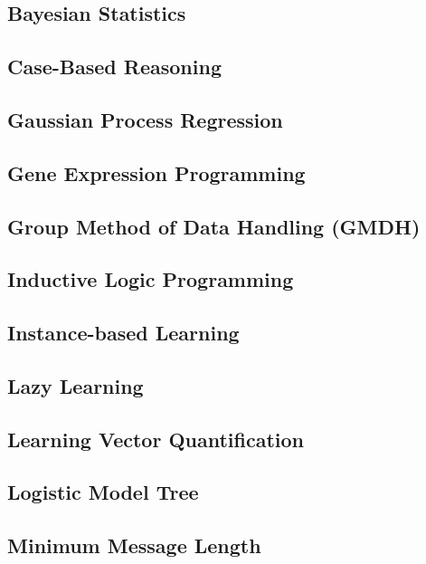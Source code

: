 \documentclass{report}
\begin{document}
	\subsection{Bayesian Statistics}
	\label{subsec:bayesian_statistics}

	\subsection{Case-Based Reasoning}

	\subsection{Gaussian Process Regression}

	\subsection{Gene Expression Programming}

	\subsection{Group Method of Data Handling (GMDH)}

	\subsection{Inductive Logic Programming}

	\subsection{Instance-based Learning}

	\subsection{Lazy Learning}

	\subsection{Learning Vector Quantification}

	\subsection{Logistic Model Tree}

	\subsection{Minimum Message Length}
\end{document}
